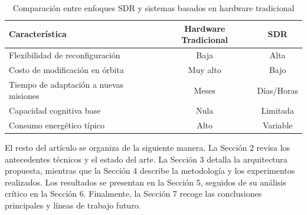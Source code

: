 \begin{table}[h]
\centering
\caption{Comparación entre enfoques SDR y sistemas basados en hardware tradicional}
\label{tab:comparacion_sdr}
\begin{tabular}{lcc}
\hline
\textbf{Característica} & \textbf{Hardware Tradicional} & \textbf{SDR} \\
\hline
Flexibilidad de reconfiguración & Baja & Alta \\
Costo de modificación en órbita & Muy alto & Bajo \\
Tiempo de adaptación a nuevas misiones & Meses & Días/Horas \\
Capacidad cognitiva base & Nula & Limitada \\
Consumo energético típico & Alto & Variable \\
\hline
\end{tabular}
\end{table}

El resto del artículo se organiza de la siguiente manera. La Sección 2 revisa los antecedentes técnicos y el estado del arte. La Sección 3 detalla la arquitectura propuesta, mientras que la Sección 4 describe la metodología y los experimentos realizados. Los resultados se presentan en la Sección 5, seguidos de su análisis crítico en la Sección 6. Finalmente, la Sección 7 recoge las conclusiones principales y líneas de trabajo futuro.